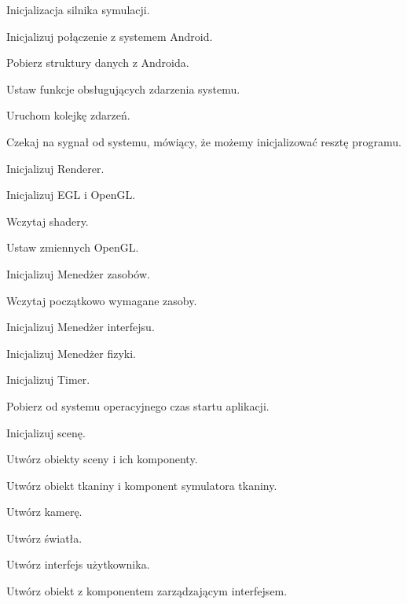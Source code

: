 	\begin{algorithm}
		\label{alg_4_1}
		\caption{Inicjalizacja silnika symulacji.}
			
				Inicjalizuj połączenie z systemem Android.
				
				\Indp
				
					Pobierz struktury danych z Androida.
					
					Ustaw funkcje obsługujących zdarzenia systemu.
					
					Uruchom kolejkę zdarzeń.
					
					Czekaj na sygnał od systemu, mówiący, że możemy inicjalizować resztę programu.
				
				\Indm
									
				Inicjalizuj Renderer.
				
				\Indp
				
					Inicjalizuj EGL i OpenGL.
					
					Wczytaj shadery.
					
					Ustaw zmiennych OpenGL.
					
				\Indm	
				
				Inicjalizuj Menedżer zasobów.
				
				\Indp
					
					Wczytaj początkowo wymagane zasoby.
				
				\Indm	
				
				Inicjalizuj Menedżer interfejsu.
				
				Inicjalizuj Menedżer fizyki.
				
				Inicjalizuj Timer.
				
				\Indp
				
					Pobierz od systemu operacyjnego czas startu aplikacji.
				
				\Indm
				
				Inicjalizuj scenę.
				
				\Indp
				
					Utwórz obiekty sceny i ich komponenty.
					
					Utwórz obiekt tkaniny i komponent symulatora tkaniny.
					
					Utwórz kamerę.
					
					Utwórz światła.
					
					Utwórz interfejs użytkownika.
					
					Utwórz obiekt z komponentem zarządzającym interfejsem.
				
				\Indm			
	\end{algorithm}
	
